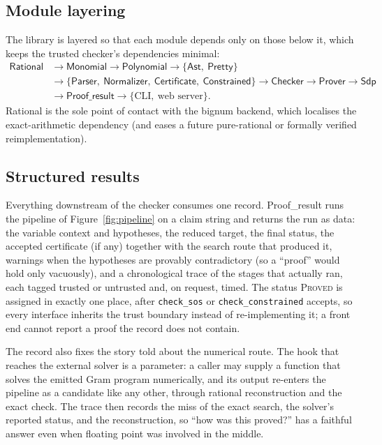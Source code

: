 \documentclass[11pt]{article}
\theoremstyle{definition}
\theoremstyle{plain}
\begin{document}
\subsection{Module layering}

The library is layered so that each module depends only on those below it, which
keeps the trusted checker's dependencies minimal:
\[
  \begin{aligned}
    \textsf{Rational} &\to \textsf{Monomial} \to \textsf{Polynomial}
      \to \{\textsf{Ast},\ \textsf{Pretty}\} \\
    &\to \{\textsf{Parser},\ \textsf{Normalizer},\ \textsf{Certificate},\
      \textsf{Constrained}\}
      \to \textsf{Checker} \to \textsf{Prover} \to \textsf{Sdp} \\
    &\to \textsf{Proof\_result} \to \{\text{CLI},\ \text{web server}\}.
  \end{aligned}
\]
\textsf{Rational} is the sole point of contact with the bignum backend, which
localises the exact-arithmetic dependency (and eases a future pure-rational or
formally verified reimplementation).

\subsection{Structured results}
\label{sec:results}

Everything downstream of the checker consumes one record. \textsf{Proof\_result}
runs the pipeline of Figure~\ref{fig:pipeline} on a claim string and returns the
run as data: the variable context and hypotheses, the reduced target, the final
status, the accepted certificate (if any) together with the search route that
produced it, warnings when the hypotheses are provably contradictory (so a
``proof'' would hold only vacuously), and a chronological trace of the stages
that actually ran, each tagged trusted or untrusted and, on request, timed. The
status \textsc{Proved} is assigned in exactly one place, after
\texttt{check\_sos} or \texttt{check\_constrained} accepts, so every interface
inherits the trust boundary instead of re-implementing it; a front end cannot
report a proof the record does not contain.

The record also fixes the story told about the numerical route. The hook that
reaches the external solver is a parameter: a caller may supply a function that
solves the emitted Gram program numerically, and its output re-enters the
pipeline as a candidate like any other, through rational reconstruction and the
exact check. The trace then records the miss of the exact search, the solver's
reported status, and the reconstruction, so ``how was this proved?'' has a
faithful answer even when floating point was involved in the middle.
\end{document}
